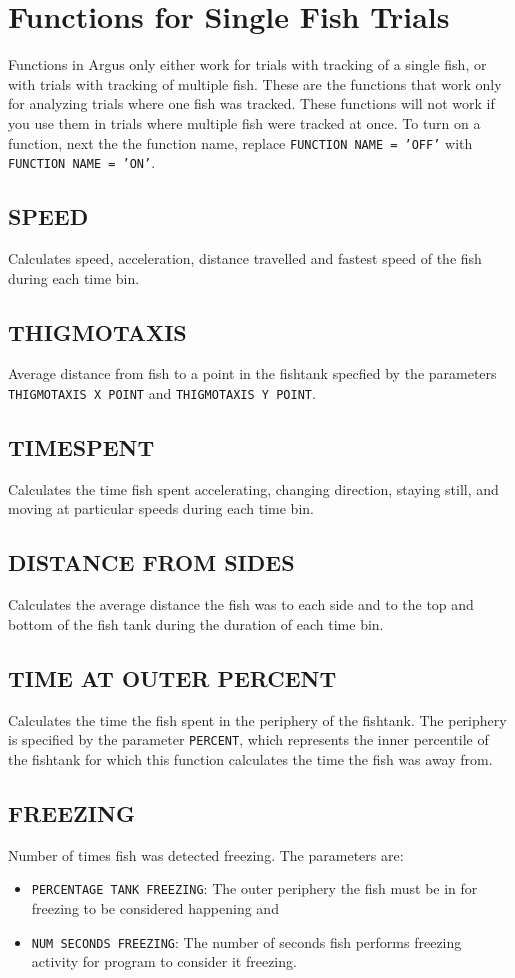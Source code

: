 \documentclass[12pt,titlepage]{report}
\begin{document}
\section{Functions for Single Fish Trials}
Functions in Argus only either work for trials with tracking of a single fish, or with trials with tracking of multiple fish. These are the functions that work only for analyzing trials where one fish was tracked. These functions will not work if you use them in trials where multiple fish were tracked at once. To turn on a function, next the the function name, replace \texttt{FUNCTION NAME = 'OFF'} with \texttt{FUNCTION NAME = 'ON'}.
\subsection{SPEED}
Calculates speed, acceleration, distance travelled and fastest speed of the fish during each time bin.
\subsection{THIGMOTAXIS}
Average distance from fish to a point in the fishtank specfied by the parameters \texttt{THIGMOTAXIS X POINT} and \texttt{THIGMOTAXIS Y POINT}. 
\subsection{TIMESPENT}
Calculates the time fish spent accelerating, changing direction, staying still, and moving at particular speeds during each time bin.
\subsection{DISTANCE FROM SIDES}
Calculates the average distance the fish was to each side and to the top and bottom of the fish tank during the duration of each time bin.
\subsection{TIME AT OUTER PERCENT}
Calculates the time the fish spent in the periphery of the fishtank. The periphery is specified by the parameter \texttt{PERCENT}, which represents the inner percentile of the fishtank for which this function calculates the time the fish was away from.
\subsection{FREEZING}
Number of times fish was detected freezing. The parameters are: 
\begin{itemize}
\item \texttt{PERCENTAGE TANK FREEZING}: The outer periphery the fish must be in for freezing to be considered happening and \item \texttt{NUM SECONDS FREEZING}: The number of seconds fish performs freezing activity for program to consider it freezing.
\end{itemize}
\end{document}
